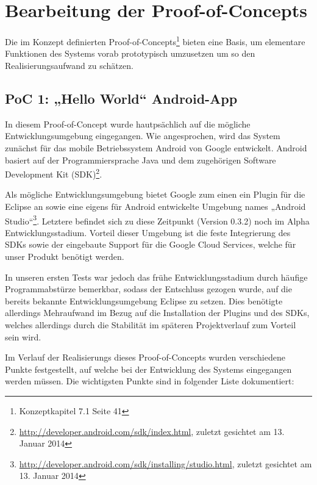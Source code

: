 
\section{Bearbeitung der Proof-of-Concepts}

Die im Konzept definierten Proof-of-Concepts\footnote{Konzeptkapitel 7.1 Seite 41} bieten eine Basis, um elementare Funktionen des Systems vorab prototypisch umzusetzen um so den Realisierungsaufwand zu schätzen.

\subsection{PoC 1: „Hello World“ Android-App}

In diesem Proof-of-Concept wurde hautpsächlich auf die mögliche Entwicklungsumgebung eingegangen. Wie angesprochen, wird das System zunächst für das mobile Betriebssystem Android von Google entwickelt. Android basiert auf der Programmiersprache Java und dem zugehörigen Software Development Kit (SDK)\footnote{\url{http://developer.android.com/sdk/index.html}, zuletzt gesichtet am 13. Januar 2014}.

Als mögliche Entwicklungsumgebung bietet Google zum einen ein Plugin für die Eclipse an sowie eine eigens für Android entwickelte Umgebung names „Android Studio“\footnote{\url{http://developer.android.com/sdk/installing/studio.html}, zuletzt gesichtet am 13. Januar 2014}. Letztere befindet sich zu diese Zeitpunkt (Version 0.3.2) noch im Alpha Entwicklungsstadium. Vorteil dieser Umgebung ist die feste Integrierung des SDKs sowie der eingebaute Support für die Google Cloud Services, welche für unser Produkt benötigt werden.

In unseren ersten Tests war jedoch das frühe Entwicklungsstadium durch häufige Programmabstürze bemerkbar, sodass der Entschluss gezogen wurde, auf die bereits bekannte Entwicklungsumgebung Eclipse zu setzen. Dies benötigte allerdings Mehraufwand im Bezug auf die Installation der Plugins und des SDKs, welches allerdings durch die Stabilität im späteren Projektverlauf zum Vorteil sein wird.

Im Verlauf der Realisierungs dieses Proof-of-Concepts wurden verschiedene Punkte festgestellt, auf welche bei der Entwicklung des Systems eingegangen werden müssen. Die wichtigsten Punkte sind in folgender Liste dokumentiert:

